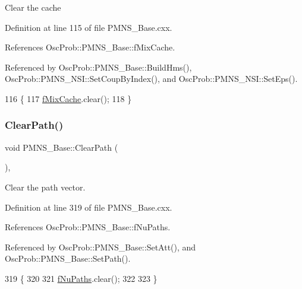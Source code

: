 Clear the cache 

Definition at line 115 of file P\+M\+N\+S\+\_\+\+Base.\+cxx.



References Osc\+Prob\+::\+P\+M\+N\+S\+\_\+\+Base\+::f\+Mix\+Cache.



Referenced by Osc\+Prob\+::\+P\+M\+N\+S\+\_\+\+Base\+::\+Build\+Hms(), Osc\+Prob\+::\+P\+M\+N\+S\+\_\+\+N\+S\+I\+::\+Set\+Coup\+By\+Index(), and Osc\+Prob\+::\+P\+M\+N\+S\+\_\+\+N\+S\+I\+::\+Set\+Eps().


\begin{DoxyCode}
116 \{
117   \hyperlink{classOscProb_1_1PMNS__Base_a8159424f20197a3a7145fe3bf2c11176}{fMixCache}.clear();
118 \}
\end{DoxyCode}
\mbox{\label{classOscProb_1_1PMNS__Base_aefe521239031c418cfaaaa550a6e13bb}} 
\subsubsection{\texorpdfstring{Clear\+Path()}{ClearPath()}}
{\footnotesize\ttfamily void P\+M\+N\+S\+\_\+\+Base\+::\+Clear\+Path (\begin{DoxyParamCaption}{ }\end{DoxyParamCaption})\hspace{0.3cm}{\ttfamily [virtual]}, {\ttfamily [inherited]}}

Clear the path vector. 

Definition at line 319 of file P\+M\+N\+S\+\_\+\+Base.\+cxx.



References Osc\+Prob\+::\+P\+M\+N\+S\+\_\+\+Base\+::f\+Nu\+Paths.



Referenced by Osc\+Prob\+::\+P\+M\+N\+S\+\_\+\+Base\+::\+Set\+Att(), and Osc\+Prob\+::\+P\+M\+N\+S\+\_\+\+Base\+::\+Set\+Path().


\begin{DoxyCode}
319                          \{
320 
321   \hyperlink{classOscProb_1_1PMNS__Base_a69db9d57e12fc7cbe0431bc6c18fac93}{fNuPaths}.clear();
322 
323 \}
\end{DoxyCode}
\mbox{\label{classOscProb_1_1PMNS__Base_a785c37fcea974628623c8881bb0fbbf9}} 
